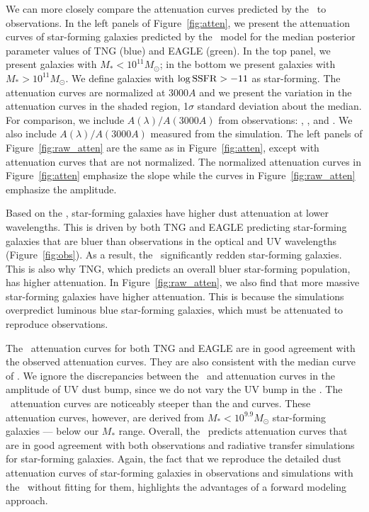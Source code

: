 We can more closely compare the attenuation curves predicted by the \eda~to 
observations. In the left panels of Figure~\ref{fig:atten}, we present the 
attenuation curves of star-forming galaxies predicted by the \eda~model for 
the median posterior parameter values of TNG (blue) and EAGLE (green). In 
the top panel, we present galaxies with $M_* < 10^{11} M_\odot$; in 
the bottom we present galaxies with $M_* > 10^{11} M_\odot$. We define
galaxies with $\log {\rm SSFR} > -11$ as star-forming. The attenuation curves 
are normalized at
$3000A$ and we present the variation in the attenuation curves in the shaded
region, 1$\sigma$ standard deviation about the median. For comparison,
we include $A(\lambda)/A(3000A)$ from observations: \cite{calzetti2000},
\cite{battisti2017}, and \cite{salim2018}. We also include $A(\lambda)/A(3000A)$
measured from the \cite{narayanan2018} simulation. The left panels of
Figure~\ref{fig:raw_atten} are the same as in Figure~\ref{fig:atten}, except
with attenuation curves that are not normalized. The normalized attenuation
curves in Figure~\ref{fig:atten} emphasize the slope while the curves in
Figure~\ref{fig:raw_atten} emphasize the amplitude. 

Based on the \eda, star-forming galaxies have higher dust attenuation at lower
wavelengths. This is driven by both TNG and EAGLE predicting star-forming
galaxies that are bluer than observations in the optical and UV wavelengths
(Figure~\ref{fig:obs}). As a result, the \eda~significantly redden star-forming galaxies. This is also why TNG, which
predicts an overall bluer star-forming population, has higher attenuation. 
In Figure~\ref{fig:raw_atten}, we also find that more massive star-forming
galaxies have higher attenuation. This is because the simulations overpredict 
luminous blue star-forming galaxies, which must be attenuated to reproduce
observations. 

The \eda~attenuation curves for both TNG and EAGLE are in good agreement with the
observed \cite{salim2018} attenuation curves. They are also consistent with the
median curve of \cite{narayanan2018}. We ignore the discrepancies between the
\eda~and \cite{narayanan2018} attenuation curves in the amplitude of UV dust
bump, since we do not vary the UV bump in the \eda. The \eda~attenuation curves 
are noticeably steeper than the \cite{calzetti2000} and \cite{battisti2017} curves. 
These attenuation curves, however, are derived from $M_* < 10^{9.9}M_\odot$ 
star-forming galaxies --- below our $M_*$ range. %
Overall, the \eda~predicts attenuation curves that are in good agreement with 
both observations and radiative transfer simulations for star-forming galaxies. 
Again, the fact that we reproduce the detailed dust attenuation curves of star-forming 
galaxies in observations and simulations with the \eda~without fitting for
them, highlights the advantages of a forward modeling approach. 

